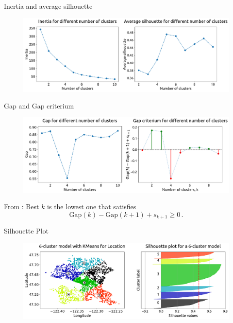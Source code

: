 \documentclass[t,11pt,compress,xcolor=table,hyperref={bookmarks=false}]{beamer}
\begin{document}
\begin{frame}{Inertia and average silhouette}
\begin{figure}
\hspace*{-0.9cm}\includegraphics[scale=0.35]{figs/loc_parfigs_1.pdf}
\end{figure}
 \end{frame}

\begin{frame}{Gap and Gap criterium}
\begin{figure}
\hspace*{-0.9cm}\includegraphics[scale=0.35]{figs/loc_parfigs_2.pdf}
\end{figure}
From \cite{Tibshirani}: Best $k$ is the lowest one that satisfies	
\begin{equation}\label{eq_gap_crit}
\mathrm{Gap}(k) - \mathrm{Gap}(k+1) + s_{k+1} \geq 0 \, .
\end{equation}
\end{frame}


\begin{frame}{Silhouette Plot}
\begin{figure}
\hspace*{-0.9cm}\includegraphics[scale=0.35]{figs/loc_clusfigs_6_cluster.pdf}
\end{figure}
\end{frame}
\end{document}
